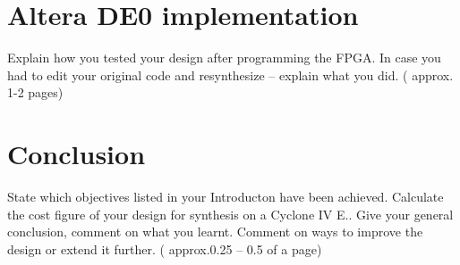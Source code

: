 \section{Altera DE0 implementation} \label{sec:implementation}
\review
{
	Explain how you tested your design after  programming the FPGA. In case you had to edit your original code and resynthesize – explain what you did.  ( approx. 1-2 pages)
}

\section{Conclusion}
\review
{
	State which objectives listed in your Introducton have been achieved. Calculate the cost figure of your design for synthesis on a Cyclone IV E.. Give your general  conclusion, comment on what you learnt.  Comment on ways to improve the design or extend it further.  ( approx.0.25 – 0.5 of a page)
}